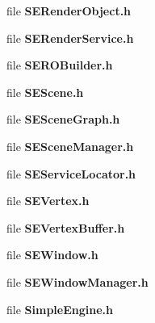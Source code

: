 \begin{DoxyCompactItemize}
\item 
file {\bf S\+E\+Render\+Object.\+h}
\item 
file {\bf S\+E\+Render\+Service.\+h}
\item 
file {\bf S\+E\+R\+O\+Builder.\+h}
\item 
file {\bf S\+E\+Scene.\+h}
\item 
file {\bf S\+E\+Scene\+Graph.\+h}
\item 
file {\bf S\+E\+Scene\+Manager.\+h}
\item 
file {\bf S\+E\+Service\+Locator.\+h}
\item 
file {\bf S\+E\+Vertex.\+h}
\item 
file {\bf S\+E\+Vertex\+Buffer.\+h}
\item 
file {\bf S\+E\+Window.\+h}
\item 
file {\bf S\+E\+Window\+Manager.\+h}
\item 
file {\bf Simple\+Engine.\+h}
\end{DoxyCompactItemize}
